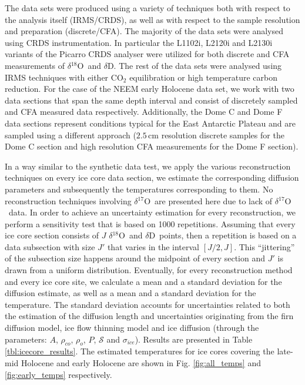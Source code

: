 \documentclass[11pt, draftcls, onecolumn]{IEEEtran} %
\numberwithin{equation}{section}
\numberwithin{table}{section}
\numberwithin{figure}{section}
\newcommand{\delOx}{$\delta{}^{18}\mathrm{O}$}
\newcommand{\delOxb}{$\delta{}^{17}\mathrm{O}$}
\newcommand{\delD}{$\delta\mathrm{D}$}
\begin{document}
The data sets were produced using a variety of techniques
both with respect to the analysis itself (IRMS/CRDS), as well as with respect to the sample resolution and preparation
(discrete/CFA). The majority of the data sets were analysed using CRDS instrumentation. In particular the L1102i, L2120i and L2130i
variants of the Picarro CRDS analyser were utilized for both discrete and CFA measurements of \delOx~and \delD.
The rest of the data sets were analysed using IRMS techniques with either $\mathrm{CO}_2$ equilibration or 
high temperature carbon reduction. For the case of the NEEM early Holocene data set, we work with two data sections that span the same 
depth interval and consist of discretely sampled and CFA measured data respectively.
Additionally, the Dome C and Dome F data sections represent conditions typical for the East Antarctic Plateau and are sampled
using a different approach ($2.5 \, \mathrm{cm}$ resolution discrete samples for the Dome C section and high resolution CFA measurements
for the Dome F section).

In a way similar to the synthetic data test, we apply the various reconstruction techniques on every ice core data
section, we estimate the corresponding diffusion parameters and subsequently the temperatures
corresponding to them. No reconstruction techniques involving \delOxb ~are presented here due to lack of 
\delOxb ~data. In order to achieve an uncertainty estimation for every reconstruction, we 
perform a sensitivity test that is based on 1000 repetitions. Assuming that every ice core section 
consists of $J$ \delOx ~and \delD ~points, then a repetition is based on a 
data subsection with size $J'$ that varies in the interval $\left[ J/2, J \right]$. This ``jittering''
of the subsection size happens around the midpoint of every section and $J'$ is 
drawn from a uniform distribution. 
Eventually, for every reconstruction method and every ice core site, we
calculate a mean and a standard deviation for the diffusion estimate, as well as a mean and a standard 
deviation for the temperature. 
The standard deviation accounts for uncertainties related to both the estimation of the diffusion length
and uncertainties originating from the firn diffusion model, ice flow thinning model
and ice diffusion (through the parameters: $A$, $\rho_{co}$, $\rho_o$, $P$, $\mathcal{S}$ and $\sigma_{ice}$).
Results are presented in Table \ref{tbl:icecore_results}. 
The estimated temperatures for ice cores covering the late-mid Holocene and early Holocene are 
shown in Fig. \ref{fig:all_temps} and \ref{fig:early_temps} respectively.
\end{document}

